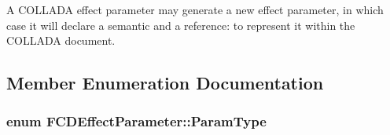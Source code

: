 A COLLADA effect parameter may generate a new effect parameter, in which case it will declare a semantic and a reference: to represent it within the COLLADA document. 

\subsection{Member Enumeration Documentation}
\hypertarget{classFCDEffectParameter_a25a513057c610179b5229dc99e840bb9}{
\subsubsection[{ParamType}]{\setlength{\rightskip}{0pt plus 5cm}enum {\bf FCDEffectParameter::ParamType}}}
\label{classFCDEffectParameter_a25a513057c610179b5229dc99e840bb9}
